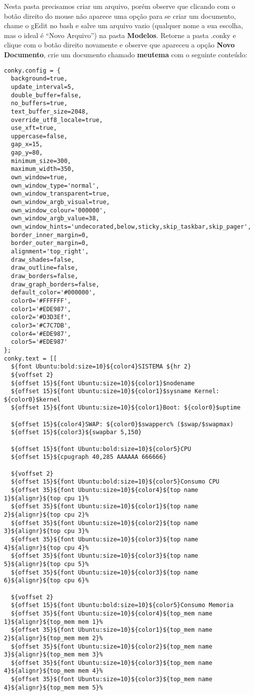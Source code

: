 Nesta pasta precisamos criar um arquivo, porém observe que clicando com o botão direito do mouse não aparece uma opção para se criar um documento, chame o gEdit no bash e salve um arquivo vazio (qualquer nome a sua escolha, mas o ideal é ``Novo Arquivo'') na pasta \textbf{Modelos}. Retorne a pasta .conky e clique com o botão direito novamente e observe que apareceu a opção
\textbf{Novo Documento}, crie um documento chamado \textbf{meutema} com o seguinte conteúdo:
\begin{lstlisting}
conky.config = {
  background=true,
  update_interval=5,
  double_buffer=false,
  no_buffers=true,
  text_buffer_size=2048,
  override_utf8_locale=true,
  use_xft=true,
  uppercase=false,
  gap_x=15,
  gap_y=80,
  minimum_size=300,
  maximum_width=350,
  own_window=true,
  own_window_type='normal',
  own_window_transparent=true,
  own_window_argb_visual=true,
  own_window_colour='000000',
  own_window_argb_value=38,
  own_window_hints='undecorated,below,sticky,skip_taskbar,skip_pager',
  border_inner_margin=0,
  border_outer_margin=0,
  alignment='top_right',
  draw_shades=false,
  draw_outline=false,
  draw_borders=false,
  draw_graph_borders=false,
  default_color='#000000',
  color0='#FFFFFF',
  color1='#EDE987',
  color2='#D3D3Ef',
  color3='#C7C7DB',
  color4='#EDE987',
  color5='#EDE987'
};
conky.text = [[
  ${font Ubuntu:bold:size=10}${color4}SISTEMA ${hr 2}
  ${voffset 2}
  ${offset 15}${font Ubuntu:size=10}${color1}$nodename
  ${offset 15}${font Ubuntu:size=10}${color1}$sysname Kernel: ${color0}$kernel
  ${offset 15}${font Ubuntu:size=10}${color1}Boot: ${color0}$uptime

  ${offset 15}${color4}SWAP: ${color0}$swapperc% ($swap/$swapmax)
  ${offset 15}${color3}${swapbar 5,150}

  ${offset 15}${font Ubuntu:bold:size=10}${color5}CPU
  ${offset 15}${cpugraph 40,285 AAAAAA 666666}
 
  ${voffset 2}
  ${offset 15}${font Ubuntu:bold:size=10}${color5}Consumo CPU
  ${offset 35}${font Ubuntu:size=10}${color4}${top name 1}${alignr}${top cpu 1}%
  ${offset 35}${font Ubuntu:size=10}${color1}${top name 2}${alignr}${top cpu 2}%
  ${offset 35}${font Ubuntu:size=10}${color2}${top name 3}${alignr}${top cpu 3}%
  ${offset 35}${font Ubuntu:size=10}${color3}${top name 4}${alignr}${top cpu 4}%
  ${offset 35}${font Ubuntu:size=10}${color3}${top name 5}${alignr}${top cpu 5}%
  ${offset 35}${font Ubuntu:size=10}${color3}${top name 6}${alignr}${top cpu 6}%

  ${voffset 2}
  ${offset 15}${font Ubuntu:bold:size=10}${color5}Consumo Memoria
  ${offset 35}${font Ubuntu:size=10}${color4}${top_mem name 1}${alignr}${top_mem mem 1}%
  ${offset 35}${font Ubuntu:size=10}${color1}${top_mem name 2}${alignr}${top_mem mem 2}%
  ${offset 35}${font Ubuntu:size=10}${color2}${top_mem name 3}${alignr}${top_mem mem 3}%
  ${offset 35}${font Ubuntu:size=10}${color3}${top_mem name 4}${alignr}${top_mem mem 4}%
  ${offset 35}${font Ubuntu:size=10}${color3}${top_mem name 4}${alignr}${top_mem mem 5}%


\end{lstlisting}
